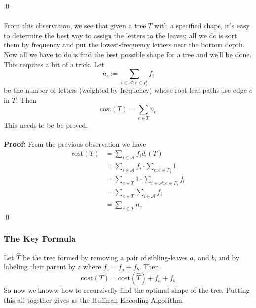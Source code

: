 \documentclass{article}
\newcommand{\x}{\cdot}
\newcommand{\proo}{\textbf{Proof: }}
\newcommand{\mcal}[1]{\mathcal{#1}}
\begin{document}
\qed\\\\
From this observation, we see that given a tree $T$ with a specified shape, it's easy to determine the best way to assign the letters to the leaves; all we do is sort them by frequency and put the lowest-frequency letters near the bottom depth. Now all we have to do is find the best possible shape for a tree and we'll be done. This requires a bit of a trick. Let
\[n_e := \sum_{i \in \mcal{A} : e \in P_i}f_i\]
be the number of letters (weighted by frequency) whose root-leaf paths use edge $e$ in $T$. Then
\[\text{cost}(T) = \sum_{e \in T} n_e\]
This needs to be be proved.\\\\
\proo From the previous observation we have
\begin{align*}
\text{cost}(T) &= \sum_{i \in \mcal{A}} f_id_i(T)\\
	&= \sum_{i \in \mcal{A}} f_i \x \sum_{e : e \in P_i}1\\
	&= \sum_{e \in T} 1\x \sum_{i \in \mcal{A} : e \in P_i} f_i\\
	&= \sum_{e \in T} \sum_{i \in \mcal{A}} f_i\\
	&= \sum_{e \in T} n_e
\end{align*}
\qed
\subsubsection{The Key Formula}
Let $\hat{T}$ be the tree formed by removing a pair of sibling-leaves $a$, and $b$, and by labeling their parent by $z$ where $f_z = f_a + f_b$. Then
\[\text{cost}(T) = \text{cost}(\hat{T}) + f_a + f_b\]
So now we knoww how to recursivelly find the optimal shape of the tree. Putting this all together gives us the Huffman Encoding Algorithm.
\end{document}
